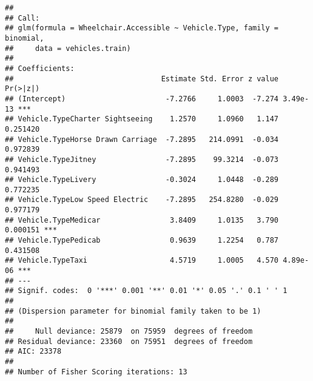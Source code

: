 \documentclass[
]{article}
\newenvironment{Shaded}{\begin{snugshade}}{\end{snugshade}}
\newcommand{\AttributeTok}[1]{\textcolor[rgb]{0.13,0.29,0.53}{#1}}
\newcommand{\ConstantTok}[1]{\textcolor[rgb]{0.56,0.35,0.01}{#1}}
\newcommand{\DecValTok}[1]{\textcolor[rgb]{0.00,0.00,0.81}{#1}}
\newcommand{\FloatTok}[1]{\textcolor[rgb]{0.00,0.00,0.81}{#1}}
\newcommand{\FunctionTok}[1]{\textcolor[rgb]{0.13,0.29,0.53}{\textbf{#1}}}
\newcommand{\NormalTok}[1]{#1}
\newcommand{\OtherTok}[1]{\textcolor[rgb]{0.56,0.35,0.01}{#1}}
\newcommand{\SpecialCharTok}[1]{\textcolor[rgb]{0.81,0.36,0.00}{\textbf{#1}}}
\newcommand{\StringTok}[1]{\textcolor[rgb]{0.31,0.60,0.02}{#1}}
\begin{document}
\begin{Shaded}
\end{Shaded}

\begin{verbatim}
## 
## Call:
## glm(formula = Wheelchair.Accessible ~ Vehicle.Type, family = binomial, 
##     data = vehicles.train)
## 
## Coefficients:
##                                  Estimate Std. Error z value Pr(>|z|)    
## (Intercept)                       -7.2766     1.0003  -7.274 3.49e-13 ***
## Vehicle.TypeCharter Sightseeing    1.2570     1.0960   1.147 0.251420    
## Vehicle.TypeHorse Drawn Carriage  -7.2895   214.0991  -0.034 0.972839    
## Vehicle.TypeJitney                -7.2895    99.3214  -0.073 0.941493    
## Vehicle.TypeLivery                -0.3024     1.0448  -0.289 0.772235    
## Vehicle.TypeLow Speed Electric    -7.2895   254.8280  -0.029 0.977179    
## Vehicle.TypeMedicar                3.8409     1.0135   3.790 0.000151 ***
## Vehicle.TypePedicab                0.9639     1.2254   0.787 0.431508    
## Vehicle.TypeTaxi                   4.5719     1.0005   4.570 4.89e-06 ***
## ---
## Signif. codes:  0 '***' 0.001 '**' 0.01 '*' 0.05 '.' 0.1 ' ' 1
## 
## (Dispersion parameter for binomial family taken to be 1)
## 
##     Null deviance: 25879  on 75959  degrees of freedom
## Residual deviance: 23360  on 75951  degrees of freedom
## AIC: 23378
## 
## Number of Fisher Scoring iterations: 13
\end{verbatim}
\end{document}
